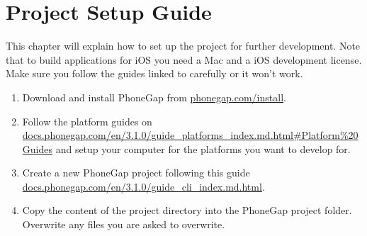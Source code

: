 \chapter{Project Setup Guide}

This chapter will explain how to set up the project for further development. Note that to build applications for iOS you need a Mac and a iOS development license\cite{iosCost}. Make sure you follow the guides linked to carefully or it won't work.

\begin{enumerate}
	\item{Download and install PhoneGap from \href{http://phonegap.com/install/}{phonegap.com/install}.}
	\item{Follow the platform guides on \newline \href{http://docs.phonegap.com/en/3.1.0/guide_platforms_index.md.html#Platform%20Guides}{docs.phonegap.com/en/3.1.0/guide\_platforms\_index.md.html\#Platform\%20Guides} and setup your computer for the platforms you want to develop for.}
	\item{Create a new PhoneGap project following this guide \newline \href{http://docs.phonegap.com/en/3.1.0/guide_cli_index.md.html}{docs.phonegap.com/en/3.1.0/guide\_cli\_index.md.html}.}
	\item{Copy the content of the project directory into the PhoneGap project folder. Overwrite any files you are asked to overwrite.}
\end{enumerate}
